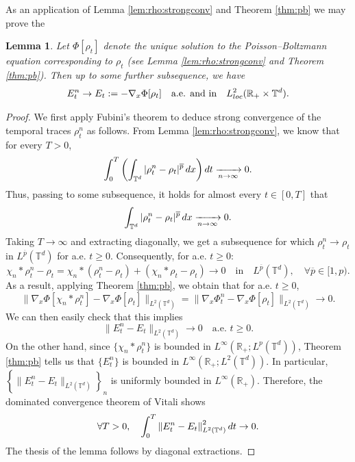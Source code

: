 \documentclass[11pt,reqno,a4paper]{amsart}
\newcommand{\R}{\mathbb{R}}
\newcommand{\intt}{\int_{\T^d}}
\newcommand{\ov}{\overline}
\newtheorem{lemma}{Lemma}[section]
\theoremstyle{definition}
\theoremstyle{remark}
\numberwithin{equation}{section}
\newcommand{\T} {\mathbb T}
\newcommand{\lt}{\left}
\newcommand{\rt}{\right}
\newcommand{\dx}{\textnormal{d}x}
\newcommand{\dt}{\textnormal{d}t}
\begin{document}
As an application of Lemma \ref{lem:rho:strongconv} and Theorem \ref{thm:pb} we may prove the

\begin{lemma}\label{lem:elecstr}
    Let $\Phi[\rho_t]$ denote the unique solution to the Poisson--Boltzmann equation corresponding to $\rho_t$ (see Lemma \ref{lem:rho:strongconv} and Theorem \ref{thm:pb}). Then up to some further subsequence, we have
    \begin{equation*}
        E_t^n \to E_t := - \nabla_x \Phi[\rho_t] \quad \text{a.e. and in} \quad L^2_{\rm loc}(\R_+\times \T^d).
    \end{equation*}
\end{lemma}

\begin{proof}
We first apply Fubini's theorem to deduce strong convergence of the temporal traces $\rho_t^n$ as follows. From Lemma \ref{lem:rho:strongconv}, we know that for every $T>0$,
\begin{equation*}
        \int_0^T \lt(\intt |\rho_t^n - \rho_t|^{\ov{p}} \,\dx \rt) \dt \xrightarrow[n\to\infty]{} 0.
    \end{equation*}
	Thus, passing to some subsequence, it holds for almost every $t\in [0,T]$ that
    \begin{equation*}
        \intt |\rho_t^n - \rho_t|^{\ov{p}} \,\dx \xrightarrow[n\to\infty]{} 0.
    \end{equation*}
Taking $T\to\infty$ and extracting diagonally, we get a subsequence for which $\rho_t^n \to \rho_t$ in $L^{\ov{p}}(\T^d)$ for a.e. $t\ge 0$. Consequently, for a.e. $t\ge 0$:
\begin{equation*}
    \chi_n * \rho_t^n - \rho_t = \chi_n * (\rho_t^n - \rho_t) + (\chi_n  * \rho_t - \rho_t) \to 0 \quad \text{in} \quad L^{\ov{p}}(\T^d), \quad \forall \ov{p}\in [1,p).
\end{equation*}
As a result, applying Theorem \ref{thm:pb}, we obtain that for a.e. $t\ge 0$,
\begin{equation*}
	\|\nabla_x \Phi[\chi_n * \rho_t^n] - \nabla_x \Phi[\rho_t]\|_{L^2(\T^d)} = \|\nabla_x \Phi_t^n - \nabla_x \Phi[\rho_t]\|_{L^2(\T^d)} \to 0.
\end{equation*}
We can then easily check that this implies
\begin{equation*}
    \|E_t^n - E_t\|_{L^2(\T^d)} \to 0 \quad \text{a.e. }t\ge 0.
\end{equation*}
On the other hand, since $\{\chi_n * \rho_t^n\}$ is bounded in $L^\infty(\R_+;L^p(\T^d))$, Theorem \ref{thm:pb} tells us that $\{E_t^n\}$ is bounded in $L^\infty(\R_+;L^2(\T^d))$. In particular, $\lt\{\|E_t^n - E_t \|_{L^2(\T^d)}\rt\}_n$ is uniformly bounded in $L^\infty(\R_+)$. Therefore, the dominated convergence theorem of Vitali shows
\begin{align*}
	\forall T>0, \quad \int_0^T \lt\|E_t^n - E_t \rt\|_{L^2(\T^d)}^2 \dt \to 0.
\end{align*}
The thesis of the lemma follows by diagonal extractions.
\end{proof}
\end{document}
